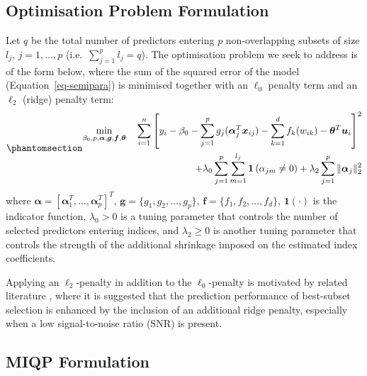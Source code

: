 \documentclass[
  11pt,
  a4paper,
]{article}
\begin{document}
\subsection{Optimisation Problem
Formulation}\label{optimisation-problem-formulation}

Let \(q\) be the total number of predictors entering \(p\)
non-overlapping subsets of size \(l_{j}\), \(j = 1, \dots, p\)
(i.e.~\(\sum_{j = 1}^{p} l_{j} = q\)). The optimisation problem we seek
to address is of the form below, where the sum of the squared error of
the model (Equation~\ref{eq-semipara}) is minimised together with an
\(\ell_{0}\) penalty term and an \(\ell_{2}\) (ridge) penalty term:
\begin{equation}\phantomsection\label{eq-smi}{
\begin{aligned}
  \min_{\beta_{0}, p, \bm{\alpha}, \bm{g}, \bm{f}, \bm{\theta}} \quad \sum_{i = 1}^{n}\left [ y_{i} - \beta_{0} - \sum_{j = 1}^{p}g_{j}(\bm{\alpha}_{j}^{T}\bm{x}_{ij}) - \sum_{k = 1}^{d}f_{k}(w_{ik}) - \bm{\theta}^{T}\bm{u}_{i}\right]^{2} \\
  + \lambda_{0}\sum_{j = 1}^{p}\sum_{m = 1}^{l_{j}}\bm{1}\left(\alpha_{jm} \neq 0\right) + \lambda_{2}\sum_{j = 1}^{p}\|\bm{\alpha}_{j}\|_2^2
\end{aligned}
}\end{equation} where
\(\bm{\alpha} = \left [\bm{\alpha}_{1}^{T}, \dots, \bm{\alpha}_{p}^{T} \right ]^{T}\),
\(\bm{g} = \{g_{1}, g_{2}, \dots, g_{p}\}\),
\(\bm{f} = \{f_{1}, f_{2}, \dots, f_{d}\}\), \(\bm{1}(\cdot)\) is the
indicator function, \(\lambda_{0} > 0\) is a tuning parameter that
controls the number of selected predictors entering indices, and
\(\lambda_{2} \ge 0\) is another tuning parameter that controls the
strength of the additional shrinkage imposed on the estimated index
coefficients.

Applying an \(\ell_{2}\)-penalty in addition to the \(\ell_{0}\)-penalty
is motivated by related literature
\autocite{Hazimeh2020,Mazumder2022,Hazimeh2023}, where it is suggested
that the prediction performance of best-subset selection is enhanced by
the inclusion of an additional ridge penalty, especially when a low
signal-to-noise ratio (SNR) is present.

\subsection{MIQP Formulation}\label{miqp-formulation}
\end{document}
